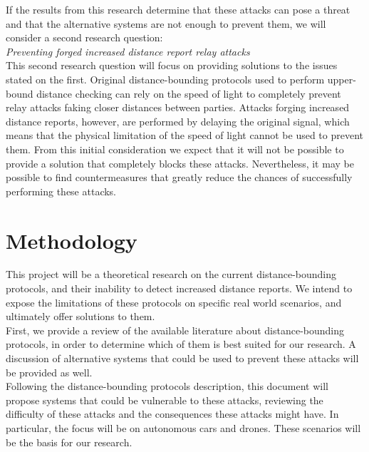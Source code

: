 \documentclass{article}
\begin{document}
If the results from this research determine that these attacks can pose a threat and that the alternative systems are not enough to prevent them, we will consider a second research question:\\

\emph{Preventing forged increased distance report relay attacks}\\

This second research question will focus on providing solutions to the issues stated on the first. Original distance-bounding protocols used to perform upper-bound distance checking can rely on the speed of light to completely prevent relay attacks faking closer distances between parties. Attacks forging increased distance reports, however, are performed by delaying the original signal, which means that the physical limitation of the speed of light cannot be used to prevent them. From this initial consideration we expect that it will not be possible to provide a solution that completely blocks these attacks. Nevertheless, it may be possible to find countermeasures that greatly reduce the chances of successfully performing these attacks.\\








\section{Methodology}
\label{sec:methodology}

This project will be a theoretical research on the current distance-bounding protocols, and their inability to detect increased distance reports. We intend to expose the limitations of these protocols on specific real world scenarios, and ultimately offer solutions to them.\\

First, we provide a review of the available literature about distance-bounding protocols, in order to determine which of them is best suited for our research. A discussion of alternative systems that could be used to prevent these attacks will be provided as well.\\

Following the distance-bounding protocols description, this document will propose systems that could be vulnerable to these attacks, reviewing the difficulty of these attacks and the consequences these attacks might have. In particular, the focus will be on autonomous cars and drones. These scenarios will be the basis for our research.\\
\end{document}
